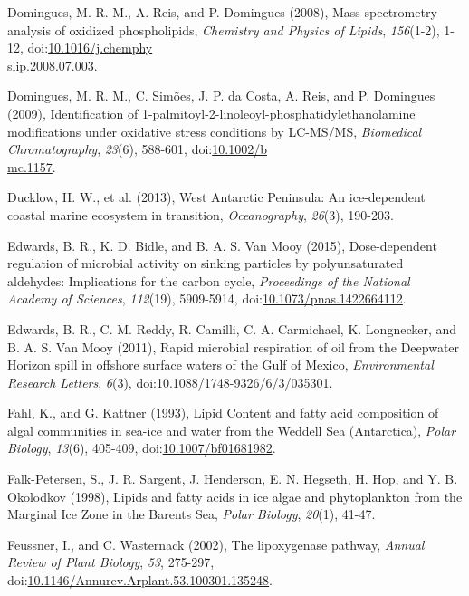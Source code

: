 \begin{singlespace}
{{Domingues, M. R. M., A. Reis, and P. Domingues (2008), Mass spectrometry analysis of oxidized phospholipids, \emph{Chemistry and Physics of Lipids}, \emph{156}(1-2), 1-12, doi:\href{http://dx.doi.org/10.1016/j.chemphyslip.2008.07.003}{10.1016/j.chemphy\\slip.2008.07.003}.

Domingues, M. R. M., C. Sim\~{o}es, J. P. da Costa, A. Reis, and P. Domingues (2009), Identification of 1-palmitoyl-2-linoleoyl-phosphatidylethanolamine modifications under oxidative stress conditions by LC-MS/MS, \emph{Biomedical Chromatography}, \emph{23}(6), 588-601, doi:\href{http://dx.doi.org/10.1002/bmc.1157}{10.1002/b\\mc.1157}.

Ducklow, H. W., et al. (2013), West Antarctic Peninsula: An ice-dependent coastal marine ecosystem in transition, \emph{Oceanography}, \emph{26}(3), 190-203.

Edwards, B. R., K. D. Bidle, and B. A. S. Van Mooy (2015), Dose-dependent regulation of microbial activity on sinking particles by polyunsaturated aldehydes: Implications for the carbon cycle, \emph{Proceedings of the National Academy of Sciences}, \emph{112}(19), 5909-5914, doi:\href{http://dx.doi.org/10.1073/pnas.1422664112}{10.1073/pnas.1422664112}.

Edwards, B. R., C. M. Reddy, R. Camilli, C. A. Carmichael, K. Longnecker, and B. A. S. Van Mooy (2011), Rapid microbial respiration of oil from the Deepwater Horizon spill in offshore surface waters of the Gulf of Mexico, \emph{Environmental Research Letters}, \emph{6}(3), doi:\href{http://dx.doi.org/10.1088/1748-9326/6/3/035301}{10.1088/1748-9326/6/3/035301}.

Fahl, K., and G. Kattner (1993), Lipid Content and fatty acid composition of algal communities in sea-ice and water from the Weddell Sea (Antarctica), \emph{Polar Biology}, \emph{13}(6), 405-409, doi:\href{http://dx.doi.org/10.1007/bf01681982}{10.1007/bf01681982}.

Falk-Petersen, S., J. R. Sargent, J. Henderson, E. N. Hegseth, H. Hop, and Y. B. Okolodkov (1998), Lipids and fatty acids in ice algae and phytoplankton from the Marginal Ice Zone in the Barents Sea, \emph{Polar Biology}, \emph{20}(1), 41-47.

Feussner, I., and C. Wasternack (2002), The lipoxygenase pathway, \emph{Annual Review of Plant Biology}, \emph{53}, 275-297, doi:\href{http://dx.doi.org/10.1146/Annurev.Arplant.53.100301.135248}{10.1146/Annurev.Arplant.53.100301.135248}.

}}
\end{singlespace}
